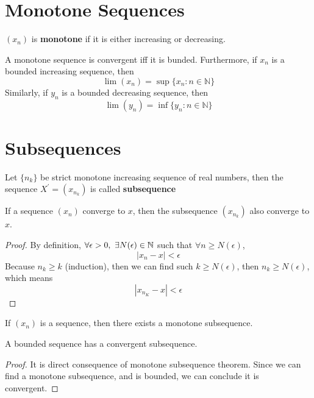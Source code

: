 \section{Monotone Sequences}
\begin{definition}
    $(x_n)$ is \textbf{monotone} if it is either increasing or decreasing.
\end{definition}
\begin{theorem} A monotone sequence is convergent iff it is bunded. Furthermore, if $x_n$ is a bounded increasing sequence, then
            \[ \lim(x_n) = \sup \{ x_n : n \in \mathbb{N}\}\]
Similarly, if $y_n$ is a bounded decreasing sequence, then
            \[ \lim(y_n) = \inf \{ y_n : n \in \mathbb{N}\}\]
\end{theorem}
\section{Subsequences}
\begin{definition} Let $\{ n_k\}$ be strict monotone increasing sequence of real numbers, then the sequence $X^{'} = (x_{n_k})$ is called \textbf{subsequence}
\end{definition}
\begin{theorem} If a sequence $(x_n)$ converge to $x$, then the subsequence $(x_{n_k})$ also converge to $x$.
    \begin{proof}
    By definition, $\forall \epsilon >0, \  \exists N(\epsilon) \in {\mathbb{N}}$ such that $\forall n \ge N(\epsilon)$,
    \[ |x_n -x| < \epsilon\]
    Because $n_k \ge k$ (induction), then we can find such $k \ge N(\epsilon)$, then $n_k \ge N(\epsilon)$, which means
    \[ |x_{n_K} - x| < \epsilon\]
\end{proof}
\end{theorem}

\begin{theorem}
    If $(x_n)$ is a sequence, then there exists a monotone subsequence.
\end{theorem}
\begin{theorem} A bounded sequence has a convergent subsequence.
    \begin{proof} It is direct consequence of monotone subsequence theorem. Since we can find a monotone subsequence, and is bounded, we can conclude it is convergent.
    \end{proof}
\end{theorem}
